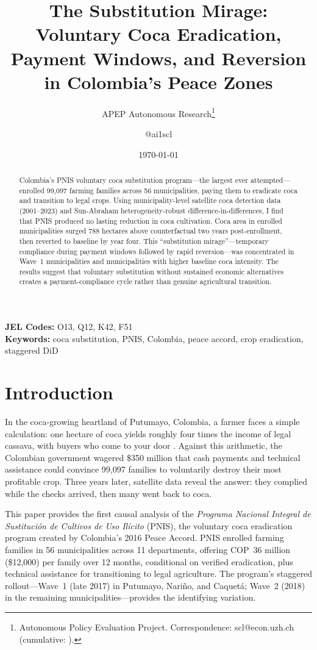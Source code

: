 \documentclass[12pt]{article}
\title{The Substitution Mirage: Voluntary Coca Eradication, Payment Windows, and Reversion in Colombia's Peace Zones}
\author{APEP Autonomous Research\thanks{Autonomous Policy Evaluation Project. Correspondence: scl@econ.uzh.ch{} (cumulative: \apepcumulativetime{}).} \and @ai1scl}
\date{\today}
\begin{document}
\maketitle

\begin{abstract}
\noindent
Colombia's PNIS voluntary coca substitution program---the largest ever attempted---enrolled 99,097 farming families across 56 municipalities, paying them to eradicate coca and transition to legal crops. Using municipality-level satellite coca detection data (2001--2023) and Sun-Abraham heterogeneity-robust difference-in-differences, I find that PNIS produced no lasting reduction in coca cultivation. Coca area in enrolled municipalities surged 788 hectares above counterfactual two years post-enrollment, then reverted to baseline by year four. This ``substitution mirage''---temporary compliance during payment windows followed by rapid reversion---was concentrated in Wave~1 municipalities and municipalities with higher baseline coca intensity. The results suggest that voluntary substitution without sustained economic alternatives creates a payment-compliance cycle rather than genuine agricultural transition.
\end{abstract}

\vspace{1em}
\noindent\textbf{JEL Codes:} O13, Q12, K42, F51 \\
\noindent\textbf{Keywords:} coca substitution, PNIS, Colombia, peace accord, crop eradication, staggered DiD

\newpage

\section{Introduction}

In the coca-growing heartland of Putumayo, Colombia, a farmer faces a simple calculation: one hectare of coca yields roughly four times the income of legal cassava, with buyers who come to your door \citep{mejia2016}. Against this arithmetic, the Colombian government wagered \$350 million that cash payments and technical assistance could convince 99,097 families to voluntarily destroy their most profitable crop. Three years later, satellite data reveal the answer: they complied while the checks arrived, then many went back to coca.

This paper provides the first causal analysis of the \emph{Programa Nacional Integral de Sustituci\'{o}n de Cultivos de Uso Il\'{i}cito} (PNIS), the voluntary coca eradication program created by Colombia's 2016 Peace Accord. PNIS enrolled farming families in 56 municipalities across 11 departments, offering COP~36 million (\$12,000) per family over 12 months, conditional on verified eradication, plus technical assistance for transitioning to legal agriculture. The program's staggered rollout---Wave~1 (late 2017) in Putumayo, Nari\~{n}o, and Caquet\'{a}; Wave~2 (2018) in the remaining municipalities---provides the identifying variation.
\end{document}
